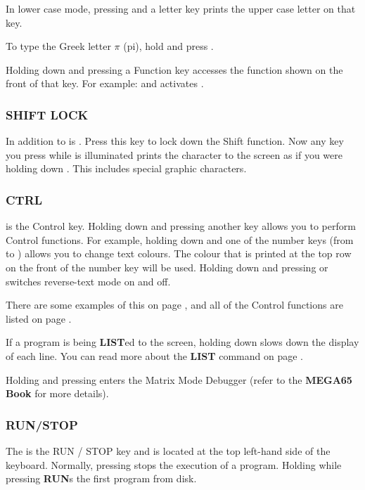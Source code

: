 In lower case mode, pressing  and a letter key prints the upper case letter on that key.

To type the Greek letter $\pi$ (pi), hold  and press \megakeywhite{$\uparrow$}.

Holding  down and pressing a Function key accesses the function shown on the front of that key. For example:  and  activates .


\subsubsection{SHIFT LOCK}
In addition to  is . Press this key to lock down the Shift function. Now any key you press while  is illuminated prints the character to the screen as if you were holding down . This includes special graphic characters.

\subsubsection{CTRL}
 is the Control key. Holding down  and pressing another key allows you to perform Control functions. For example, holding down  and one of the number keys (from  to ) allows you to change text colours. The colour that is printed at the top row on the front of the number key will be used. Holding down  and pressing  or  switches reverse-text mode on and off.

There are some examples of this on page \pageref{sec:screen-editor}, and all of the Control functions are listed on page \pageref{appendix:controlcodes}.

If a program is being {\bf LIST}ed to the screen, holding down  slows down the display of each line. You can read more about the {\bf LIST} command on page \pageref{BASIC 65 Commands!LIST}.

Holding  and pressing \megakey{*} enters the Matrix Mode Debugger (refer to the {\bf MEGA65 Book} for more details).

\subsubsection{RUN/STOP}
The  is the RUN / STOP key and is located at the top left-hand side of the keyboard. Normally, pressing  stops the execution of a program. Holding  while pressing  {\bf RUN}s the first program from disk.

